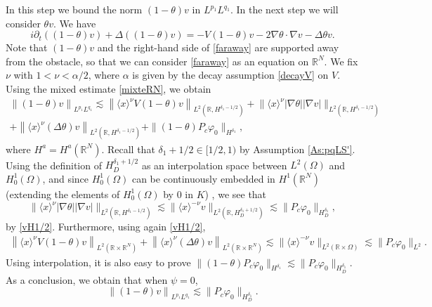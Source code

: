 \documentclass[10pt,leqno]{amsart}
\theoremstyle{definition}%
\theoremstyle{remark}
\numberwithin{equation}{section}
\newcommand{\R}{\mathbb{R}}
\renewcommand{\^}{\widehat}%
\newcommand{\la}{\langle}
\newcommand{\ra}{\rangle}
\begin{document}
In this step we bound the norm $(1-\theta)v$ in $L^{p_1}L^{q_1}$. In the next step we will consider  $\theta v$. We have 
\begin{equation}
 \label{faraway}
 i\partial_t \left((1-\theta)v\right)+\Delta\left((1-\theta)v\right)=-V(1-\theta)v -2\nabla\theta\cdot\nabla v-\Delta \theta v.
\end{equation} 
Note that $(1-\theta)v$ and the right-hand side of \eqref{faraway} are supported away from the obstacle, so that we can consider \eqref{faraway} as an equation on $\R^N$. We fix $\nu$ with $1<\nu<\alpha/2$, where $\alpha$ is given by the decay assumption \eqref{decayV} on $V$.
Using the mixed estimate \eqref{mixteRN}, we obtain
\begin{multline}
 \label{mixte1}
 \left\|(1-\theta)v\right\|_{L^{p_1}L^{q_1}}\lesssim \left\|\la x\ra^{\nu} V(1-\theta)v\right\|_{L^2(\R,H^{\delta_1-1/2})}
 +\big\|\la x\ra^{\nu} |\nabla \theta||\nabla v|\big\|_{L^2(\R,H^{\delta_1-1/2})}\\+\left\|\la x\ra^{\nu}(\Delta \theta) v\right\|_{L^2(\R,H^{\delta_1-1/2})}+\|(1-\theta)P_c\varphi_0\|_{H^{\delta_1}},
\end{multline}
where $H^{a}=H^{a}(\R^N)$. Recall that $\delta_1+1/2\in [1/2,1)$ by Assumption \ref{As:pqLS'}. Using the definition of $H^{\delta_1+1/2}_D$ as an interpolation space between $L^2(\Omega)$ and $H^{1}_0(\Omega)$, and since $H^1_0(\Omega)$ can be continuously embedded in $H^1(\R^N)$ (extending the elements of $H^1_0(\Omega)$ by $0$ in $K$) , we see that
$$\big\|\la x\ra^{\nu} |\nabla \theta||\nabla v|\big\|_{L^2(\R,H^{\delta_1-1/2})}\lesssim \|\la x\ra^{-\nu}v\|_{L^2(\R,H^{\delta_1+1/2}_D)}\lesssim \|P_c\varphi_0\|_{H^{\delta_1}_D},$$
by \eqref{vH1/2}. Furthermore, using again \eqref{vH1/2},
\begin{multline*}
\left\|\la x\ra^{\nu} V(1-\theta)v\right\|_{L^2(\R\times \R^N)}+\left\|\la x\ra^{\nu}(\Delta \theta) v\right\|_{L^2(\R\times \R^N)}\lesssim \|\la x\ra^{-\nu}v\|_{L^2(\R\times \Omega)}\lesssim \|P_c\varphi_0\|_{L^2}.
\end{multline*}
Using interpolation, it is also easy to prove $\|(1-\theta)P_c\varphi_0\|_{H^{\delta_1}}\lesssim \|P_c\varphi_0\|_{H^{\delta_1}_D}$.
As a conclusion, we obtain that when $\psi=0$,
\begin{equation}
 \label{StrichartzLS_faraway}
 \left\|(1-\theta)v\right\|_{L^{p_1}L^{q_1}}\lesssim \|P_c\varphi_0\|_{H_D^{\delta_1}}.
\end{equation} 
\end{document}
